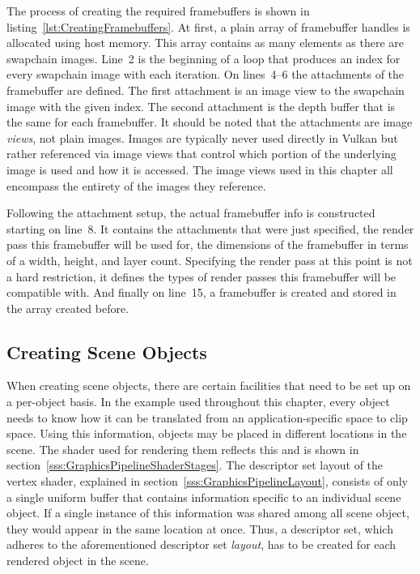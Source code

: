       The process of creating the required framebuffers is shown in listing~\ref{lst:CreatingFramebuffers}.
      At first, a plain array of framebuffer handles is allocated using host memory.
      This array contains as many elements as there are swapchain images.
      Line~2 is the beginning of a loop that produces an index for every swapchain image with each iteration.
      On lines~4--6 the attachments of the framebuffer are defined.
      The first attachment is an image view to the swapchain image with the given index.
      The second attachment is the depth buffer that is the same for each framebuffer.
      It should be noted that the attachments are image \textit{views}, not plain images.
      Images are typically never used directly in Vulkan but rather referenced via image views that control which portion of the underlying image is used and how it is accessed.
      The image views used in this chapter all encompass the entirety of the images they reference.

      Following the attachment setup, the actual framebuffer info is constructed starting on line~8.
      It contains the attachments that were just specified, the render pass this framebuffer will be used for, the dimensions of the framebuffer in terms of a width, height, and layer count.
      Specifying the render pass at this point is not a hard restriction, it defines the types of render passes this framebuffer will be compatible with.
      And finally on line~15, a framebuffer is created and stored in the array created before.

    \subsection{Creating Scene Objects}
    \label{sss:CreatingSceneObjects}

      When creating scene objects, there are certain facilities that need to be set up on a per-object basis.
      In the example used throughout this chapter, every object needs to know how it can be translated from an application-specific space to clip space.
      Using this information, objects may be placed in different locations in the scene.
      The shader used for rendering them reflects this and is shown in section~\ref{sss:GraphicsPipelineShaderStages}.
      The descriptor set layout of the vertex shader, explained in section~\ref{sss:GraphicsPipelineLayout}, consists of only a single uniform buffer that contains information specific to an individual scene object.
      If a single instance of this information was shared among all scene object, they would appear in the same location at once.
      Thus, a descriptor set, which adheres to the aforementioned descriptor set \textit{layout}, has to be created for each rendered object in the scene.

